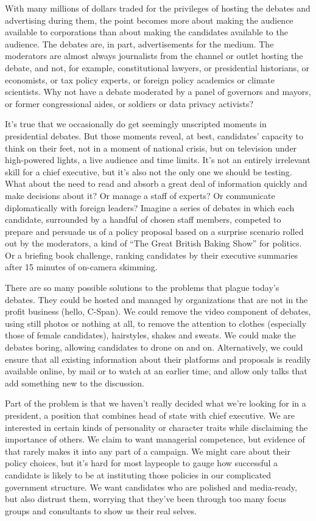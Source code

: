 With many millions of dollars traded for the privileges of hosting the
debates and advertising during them, the point becomes more about making
the audience available to corporations than about making the candidates
available to the audience. The debates are, in part, advertisements for
the medium. The moderators are almost always journalists from the
channel or outlet hosting the debate, and not, for example,
constitutional lawyers, or presidential historians, or economists, or
tax policy experts, or foreign policy academics or climate scientists.
Why not have a debate moderated by a panel of governors and mayors, or
former congressional aides, or soldiers or data privacy activists?

It's true that we occasionally do get seemingly unscripted moments in
presidential debates. But those moments reveal, at best, candidates'
capacity to think on their feet, not in a moment of national crisis, but
on television under high-powered lights, a live audience and time
limits. It's not an entirely irrelevant skill for a chief executive, but
it's also not the only one we should be testing. What about the need to
read and absorb a great deal of information quickly and make decisions
about it? Or manage a staff of experts? Or communicate diplomatically
with foreign leaders? Imagine a series of debates in which each
candidate, surrounded by a handful of chosen staff members, competed to
prepare and persuade us of a policy proposal based on a surprise
scenario rolled out by the moderators, a kind of ``The Great British
Baking Show'' for politics. Or a briefing book challenge, ranking
candidates by their executive summaries after 15 minutes of on-camera
skimming.

There are so many possible solutions to the problems that plague today's
debates. They could be hosted and managed by organizations that are not
in the profit business (hello, C-Span). We could remove the video
component of debates, using still photos or nothing at all, to remove
the attention to clothes (especially those of female candidates),
hairstyles, shakes and sweats. We could make the debates boring,
allowing candidates to drone on and on. Alternatively, we could ensure
that all existing information about their platforms and proposals is
readily available online, by mail or to watch at an earlier time, and
allow only talks that add something new to the discussion.

Part of the problem is that we haven't really decided what we're looking
for in a president, a position that combines head of state with chief
executive. We are interested in certain kinds of personality or
character traits while disclaiming the importance of others. We claim to
want managerial competence, but evidence of that rarely makes it into
any part of a campaign. We might care about their policy choices, but
it's hard for most laypeople to gauge how successful a candidate is
likely to be at instituting those policies in our complicated government
structure. We want candidates who are polished and media-ready, but also
distrust them, worrying that they've been through too many focus groups
and consultants to show us their real selves.

